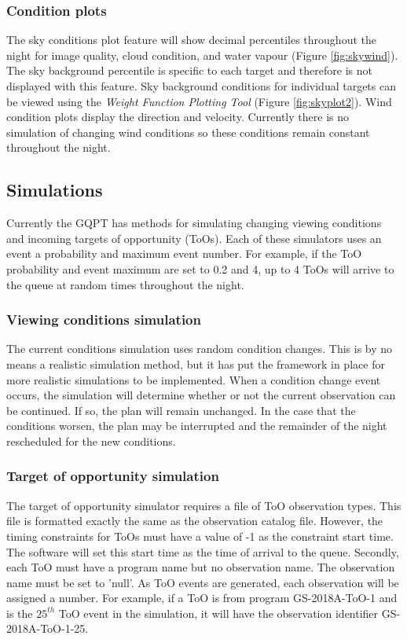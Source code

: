 \documentclass{article}
\begin{document}
\subsubsection{Condition plots}
The sky conditions plot feature will show decimal percentiles throughout the night for image quality, cloud condition, and water vapour (Figure \ref{fig:skywind}).  The sky background percentile is specific to each target and therefore is not displayed with this feature.  Sky background conditions for individual targets can be viewed using the \textit{Weight Function Plotting Tool} (Figure \ref{fig:skyplot2}).  Wind condition plots display the direction and velocity.  Currently there is no simulation of changing wind conditions so these conditions remain constant throughout the night.

\subsection{Simulations}
\label{sec:sims}
Currently the GQPT has methods for simulating changing viewing conditions and incoming targets of opportunity (ToOs).  Each of these simulators uses an event a probability and maximum event number.  For example, if the ToO probability and event maximum are set to 0.2 and 4, up to 4 ToOs will arrive to the queue at random times throughout the night.  

\subsubsection{Viewing conditions simulation}
The current conditions simulation uses random condition changes.  This is by no means a realistic simulation method, but it has put the framework in place for more realistic simulations to be implemented.  When a condition change event occurs, the simulation will determine whether or not the current observation can be continued.  If so, the plan will remain unchanged.  In the case that the conditions worsen, the plan may be interrupted and the remainder of the night rescheduled for the new conditions.

\subsubsection{Target of opportunity simulation}
The target of opportunity simulator requires a file of ToO observation types.  This file is formatted exactly the same as the observation catalog file.  However, the timing constraints for ToOs must have a value of -1 as the constraint start time.  The software will set this start time as the time of arrival to the queue.  Secondly, each ToO must have a program name but no observation name.  The observation name must be set to 'null'.  As ToO events are generated, each observation will be assigned a number.  For example, if a ToO is from program GS-2018A-ToO-1 and is the $25^{th}$ ToO event in the simulation, it will have the observation identifier GS-2018A-ToO-1-25.  \\
\end{document}
